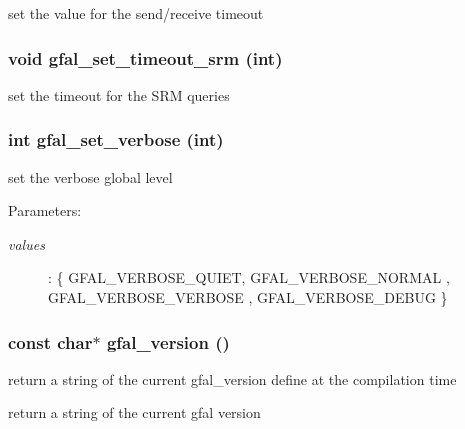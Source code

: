 set the value for the send/receive timeout 
\subsubsection{\setlength{\rightskip}{0pt plus 5cm}void gfal\_\-set\_\-timeout\_\-srm (int)}\label{group__common__group_gc0dac1437f150d4b5b8779f456050bec}


set the timeout for the SRM queries 
\subsubsection{\setlength{\rightskip}{0pt plus 5cm}int gfal\_\-set\_\-verbose (int)}\label{group__common__group_g331e181c2fadd801321ad43033835052}


set the verbose global level 

\begin{Desc}
\item[Parameters:]
\begin{description}
\item[{\em values}]: \{ GFAL\_\-VERBOSE\_\-QUIET, GFAL\_\-VERBOSE\_\-NORMAL , GFAL\_\-VERBOSE\_\-VERBOSE , GFAL\_\-VERBOSE\_\-DEBUG \} \end{description}
\end{Desc}
\subsubsection{\setlength{\rightskip}{0pt plus 5cm}const char$\ast$ gfal\_\-version ()}\label{group__common__group_ga5a8df616e6a5e6fc1d94e2374c7ccf2}


return a string of the current gfal\_\-version define at the compilation time 

return a string of the current gfal version 